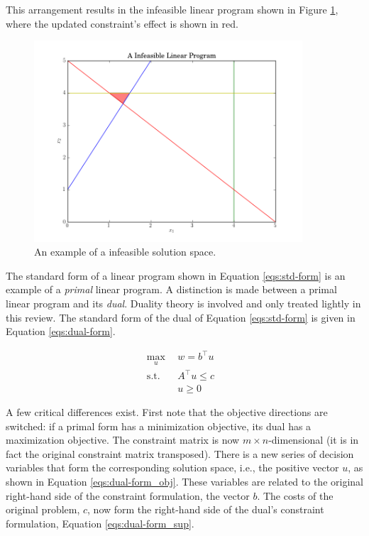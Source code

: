This arrangement results in the infeasible linear program shown in
Figure \ref{fig:infeasible}, where the updated constraint's effect is shown in
red.

\begin{figure}[H]
  \begin{center}
    \includegraphics[height=7.5cm]{./backmatter/figs/infeasible.png}
  \caption{An example of a infeasible solution space.}
  \label{fig:infeasible}
  \end{center}
\end{figure}

The standard form of a linear program shown in Equation \ref{eqs:std-form} is an
example of a \textit{primal} linear program. A distinction is made between a
primal linear program and its \textit{dual}. Duality theory is involved and only
treated lightly in this review. The standard form of the dual of Equation
\ref{eqs:std-form} is given in Equation \ref{eqs:dual-form}.

\begin{subequations}\label{eqs:dual-form}
  \begin{align}
    \max_{u} \:\: & 
    w = b^{\top} u
    & \label{eqs:dual-form_obj} \\
    \text{s.t.} \:\: &
    A^{\top} u \leq c 
    & \label{eqs:dual-form_sup} \\
    &
    u \geq 0
    &\label{eqs:dual-form_x}
  \end{align}
\end{subequations}

A few critical differences exist. First note that the objective directions are
switched: if a primal form has a minimization objective, its dual has a
maximization objective. The constraint matrix is now $m \times n$-dimensional
(it is in fact the original constraint matrix transposed). There is a new series
of decision variables that form the corresponding solution space, i.e., the
positive vector $u$, as shown in Equation \ref{eqs:dual-form_obj}. These
variables are related to the original right-hand side of the constraint
formulation, the vector $b$. The costs of the original problem, $c$, now form
the right-hand side of the dual's constraint formulation,
Equation \ref{eqs:dual-form_sup}.

